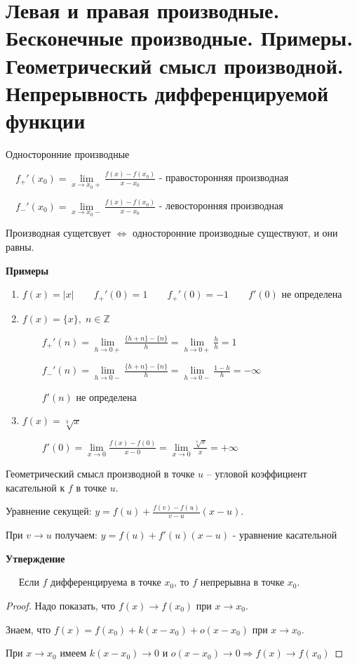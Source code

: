 \section{Левая и правая производные. Бесконечные производные. Примеры. Геометрический смысл производной. Непрерывность дифференцируемой функции}
\begin{conj}
    Односторонние производные

    $\quad f_{+}'(x_0) = \lim\limits_{x \to x_0+} \frac{f(x) - f(x_0)}{x - x_0}$ - правосторонняя производная

    $\quad f_{-}'(x_0) = \lim\limits_{x \to x_0-} \frac{f(x) - f(x_0)}{x - x_0}$ - левосторонняя производная
\end{conj}
\begin{notice}
    Производная сущетсвует $\Leftrightarrow$ односторонние производные существуют, и они равны.
\end{notice}


\textbf{Примеры}
\begin{enumerate}
    \item $f(x) = |x| \quad\quad f_{+}'(0) = 1 \quad\quad f_{+}'(0) = -1 \quad\quad f'(0)$ не определена
    \item $f(x) = \{x\}, \; n \in \mathbb{Z}$
    
    $\quad\quad f_{+}'(n) = \lim\limits_{h \to 0+} \frac{\{h + n\} - \{n\}}{h} = \lim\limits_{h \to 0+} \frac{h}{h} = 1$

    $\quad\quad f_{-}'(n) = \lim\limits_{h \to 0-} \frac{\{h + n\} - \{n\}}{h} = \lim\limits_{h \to 0-} \frac{1 - h}{h} = -\infty$

    $\quad\quad f'(n)$ не определена
    \item  $f(x) = \sqrt[3]{x}$
    
    $\quad\quad f'(0) = \lim\limits_{x \to 0} \frac{f(x) - f(0)}{x - 0} = \lim\limits_{x \to 0} \frac{\sqrt[3]{x}}{x} = +\infty$
\end{enumerate}
\begin{conj}
    Геометрический смысл производной в точке $u$ -- угловой коэффициент касательной к $f$ в точке $u$.
\end{conj}
Уравнение секущей: $y = f(u) + \frac{f(v) - f(u)}{v - u}(x - u)$. 

При $v \to u$ получаем: $y = f(u) + f'(u)(x - u)$ - уравнение касательной


\textbf{Утверждение} 

$\quad$ Если $f$ дифференцируема в точке $x_0$, то $f$ непрерывна в точке $x_0$.
\begin{proof}
    Надо показать, что $f(x) \to f(x_0)$ при $x \to x_0$.  
    
    Знаем, что $f(x) = f(x_0) + k(x - x_0) + o(x - x_0)$ при $x \to x_0$. 

    При $x \to x_0$ имеем $k(x - x_0) \to 0$ и $o(x - x_0) \to 0 \Rightarrow f(x) \to f(x_0)$ 
\end{proof}